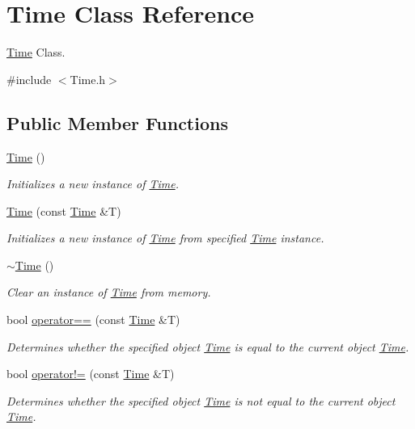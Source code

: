 \hypertarget{class_time}{\section{Time Class Reference}
\label{class_time}
}


\hyperlink{class_time}{Time} Class.  




{\ttfamily \#include $<$Time.\-h$>$}

\subsection*{Public Member Functions}
\begin{DoxyCompactItemize}
\item 
\hyperlink{class_time_a4245e409c7347d1d671858962c2ca3b5}{Time} ()
\begin{DoxyCompactList}\small\item\em Initializes a new instance of \hyperlink{class_time}{Time}. \end{DoxyCompactList}\item 
\hyperlink{class_time_aa90303dd0454141b15ceb358d60795a4}{Time} (const \hyperlink{class_time}{Time} \&T)
\begin{DoxyCompactList}\small\item\em Initializes a new instance of \hyperlink{class_time}{Time} from specified \hyperlink{class_time}{Time} instance. \end{DoxyCompactList}\item 
\hyperlink{class_time_a1e92dbe963fa3cdd6bea207680f5f6d1}{$\sim$\-Time} ()
\begin{DoxyCompactList}\small\item\em Clear an instance of \hyperlink{class_time}{Time} from memory. \end{DoxyCompactList}\item 
bool \hyperlink{class_time_a0e5c32707d684d728e2b2f4f33748cf0}{operator==} (const \hyperlink{class_time}{Time} \&T)
\begin{DoxyCompactList}\small\item\em Determines whether the specified object \hyperlink{class_time}{Time} is equal to the current object \hyperlink{class_time}{Time}. \end{DoxyCompactList}\item 
bool \hyperlink{class_time_aa582792aedd7600a67245f574650dcb5}{operator!=} (const \hyperlink{class_time}{Time} \&T)
\begin{DoxyCompactList}\small\item\em Determines whether the specified object \hyperlink{class_time}{Time} is not equal to the current object \hyperlink{class_time}{Time}. \end{DoxyCompactList}\item 

\end{DoxyCompactItemize}
